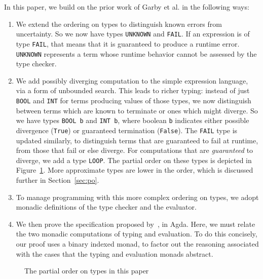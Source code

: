 \documentclass[acmsmall,screen,review]{acmart}
\begin{document}
In this paper, we build on the prior work of Garby et al. in the following ways:

\begin{enumerate}
\item We extend the ordering on types to distinguish known errors from uncertainty.  So we now have
  types \verb|UNKNOWN| and \verb|FAIL|.  If an expression is of type \verb|FAIL|, that means that
  it is guaranteed to produce a runtime error.  \verb|UNKNOWN| represents a term whose runtime behavior
  cannot be assessed by the type checker.
  
  \item We add possibly diverging computation to the simple expression
    language, via a form of unbounded search.  This leads to richer
    typing: instead of just \verb|BOOL| and \verb|INT| for terms
    producing values of those types, we now distinguish between terms
    which are known to terminate or ones which might diverge.  So we
    have types \verb|BOOL b| and \verb|INT b|, where boolean \verb|b|
    indicates either possible divergence (\verb|True|) or guaranteed
    termination (\verb|False|).  The \verb|FAIL| type is updated
    similarly, to distinguish terms that are guaranteed to fail at
    runtime, from those that fail or else diverge.  For computations
    that are \emph{guaranteed} to diverge, we add a type \verb|LOOP|.
    The partial order on these types is depicted in
    Figure~\ref{fig:po}.  More approximate types are lower in the
    order, which is discussed further in Section~\ref{sec:po}.
    
  \item To manage programming with this more complex ordering on
    types, we adopt monadic definitions of the type checker and the
    evaluator.

  \item We then prove the specification proposed by~\citet{garby+25},
    in Agda.  Here, we must relate the two monadic computations of
    typing and evaluation.  To do this concisely, our proof uses a
    binary indexed monad, to factor out the reasoning associated with
    the cases that the typing and evaluation monads abstract.

    \end{enumerate}


\begin{figure}
\llpic
\caption{The partial order on types in this paper}
\label{fig:po}
\end{figure}
\end{document}
